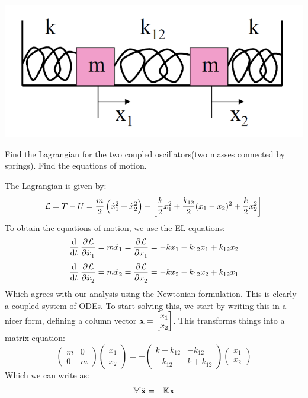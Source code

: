 \documentclass[../PHYS306Notes.tex]{subfiles}
\begin{document}
\begin{center}
    \includegraphics[scale=0.5]{Lecture-10/w10-img1.png}
\end{center}
\begin{p}
Find the Lagrangian for the two coupled oscillators(two masses connected by springs). Find the equations of motion.
\end{p}
\begin{s}
The Lagrangian is given by:
\[\mathcal{L} = T - U = \frac{m}{2}\left(\dot{x}^2_1 + \dot{x}^2_2\right) - \left[\frac{k}{2}x_1^2 + \frac{k_{12}}{2}(x_1 - x_2)^2 + \frac{k}{2}x_2^2\right]\]
To obtain the equations of motion, we use the EL equations:
\[\dod{}{t}\dpd{\LL}{\dot{x}_1} = m\ddot{x}_1 = \dpd{\LL}{x_1} = -kx_1 - k_{12}x_1 + k_{12}x_2\]
\[\dod{}{t}\dpd{\LL}{\dot{x}_2} = m\ddot{x}_2 = \dpd{\LL}{x_2} = -kx_2 - k_{12}x_2 + k_{12}x_1\]
Which agrees with our analysis using the Newtonian formulation. This is clearly a coupled system of ODEs. To start solving this, we start by writing this in a nicer form, defining a column vector $\mathbf{x} = \begin{bmatrix}x_1 \\ x_2\end{bmatrix}$. This transforms things into a matrix equation:
$$\left(\begin{array}{cc}m & 0 \\ 0 & m\end{array}\right)\left(\begin{array}{c}\ddot{x}_{1} \\ \ddot{x}_{2}\end{array}\right)=-\left(\begin{array}{cc}k+k_{12} & -k_{12} \\ -k_{12} & k+k_{12}\end{array}\right)\left(\begin{array}{c}x_{1} \\ x_{2}\end{array}\right)$$
Which we can write as:
\[\mathbb{M}\ddot{\mathbf{x}} = -\mathbb{K}\mathbf{x}\]
\end{s}
\end{document}
